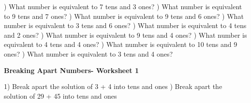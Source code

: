 \documentclass{article}%
\begin{document}
\newline%
\newline%
) What number is equivalent to 7 tens and 3 ones?%
\newline%
\newline%
) What number is equivalent to 9 tens and 7 ones?%
\newline%
\newline%
) What number is equivalent to 9 tens and 6 ones?%
\newline%
\newline%
) What number is equivalent to 3 tens and 6 ones?%
\newline%
\newline%
) What number is equivalent to 4 tens and 2 ones?%
\newline%
\newline%
) What number is equivalent to 9 tens and 4 ones?%
\newline%
\newline%
) What number is equivalent to 4 tens and 4 ones?%
\newline%
\newline%
) What number is equivalent to 10 tens and 9 ones?%
\newline%
\newline%
) What number is equivalent to 3 tens and 4 ones?%
\newline%
\newline%
\newline%
\pagebreak%
\large%
\begin{center}%
\textbf{Breaking Apart Numbers- Worksheet 1}%
\newline%
\newline%
\newline%
\end{center} \normalsize%
1) Break apart the solution of 3 + 4 into tens and ones%
\newline%
\newline%
) Break apart the solution of 29 + 45 into tens and ones%
\newline%
\end{document}
